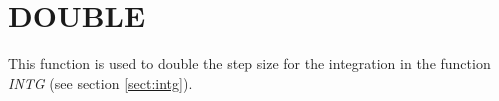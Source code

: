 \section{DOUBLE}
\label{sect:double}

\noindent This function is used to double the step size for the integration
in the function {\em INTG} (see section \ref{sect:intg}).\\
